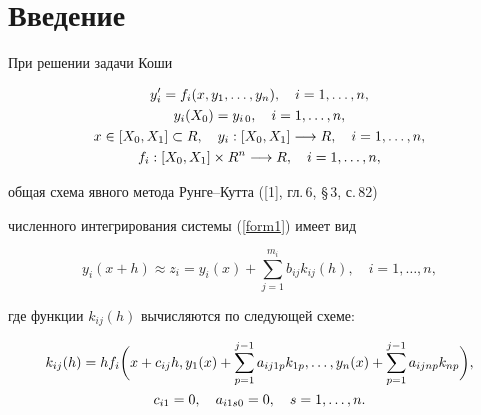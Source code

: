 \maketitle


\label{begin}





 








\section{Введение}





При решении задачи Коши


\begin{gather}


y_{i}' =f_{i}(x,y_{1},\dotsc,y_{n}) ,\quad i=1,\dotsc,n,\label{form1} \\


y_{i}(X_{0})=y_{i\,0},\quad i=1,\dotsc,n,\notag \\


x \in [X_{0},X_{1}] \subset R,\quad


y_{i}:[X_{0},X_{1}] \longrightarrow


R ,\quad i=1,\dotsc,n,\notag\\


f_{i}:[X_{0},X_{1}] \times R^{n}


\longrightarrow R,\quad i=1,\dotsc,n,\notag


\end{gather}


общая схема явного метода Рунге--Кутта ([1], гл.\,6, \S\,3, с.\,82)


численного интегрирования системы (\ref{form1}) имеет вид


\begin{equation}


y_{i}(x+h)\approx z_{i} = y_{i}(x)+\sum_{j=1}^{m_{i}} b_{ij}


k_{ij}(h), \quad i=1,\dotsc,n, \label{form3}


\end{equation}


где функции $k_{ij}(h)$ вычисляются по следующей схеме:


\begin{gather}


k_{ij}(h)=h f_{i}\bigg(x+c_{ij} h,y_{1}(x)+\sum_{p=1}^{j -1}


a_{ij1p}k_{1p},\dotsc,


y_{n}(x)+\sum_{p=1}^{j -1}


a_{ijnp}k_{np}\bigg), \label{form4}\\


c_{i1}=0,\quad a_{i1s0}= 0,\quad s=1,\dotsc,n. \notag


\end{gather}


